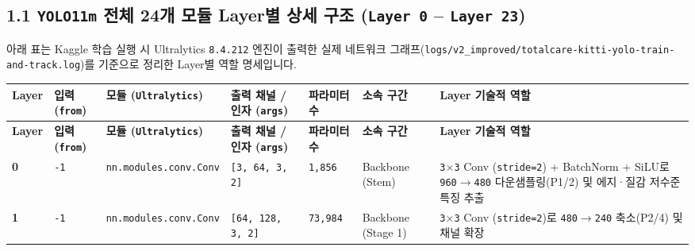 \documentclass[10.5pt,a4paper]{article}
\begin{document}
\subsection{1.1 \texttt{YOLO11m} 전체 24개 모듈 Layer별 상세 구조 (\texttt{Layer 0} -- \texttt{Layer 23})}

아래 표는 Kaggle 학습 실행 시 Ultralytics \texttt{8.\allowbreak{}4.\allowbreak{}212} 엔진이 출력한 실제 네트워크 그래프(\texttt{logs/\allowbreak{}v2\_\allowbreak{}improved/\allowbreak{}totalcare-\allowbreak{}kitti-\allowbreak{}yolo-\allowbreak{}train-\allowbreak{}and-\allowbreak{}track.\allowbreak{}log})를 기준으로 정리한 Layer별 역할 명세입니다.



\begin{footnotesize}
\setlength{\tabcolsep}{4pt}
\setlength{\LTleft}{0pt}\setlength{\LTright}{0pt}
\begin{longtable}{>{\raggedright\arraybackslash}p{} >{\raggedright\arraybackslash}p{} >{\raggedright\arraybackslash}p{} >{\raggedright\arraybackslash}p{} >{\raggedright\arraybackslash}p{} >{\raggedright\arraybackslash}p{} >{\raggedright\arraybackslash}p{}}
\toprule
\textbf{Layer} & \textbf{입력(\texttt{from})} & \textbf{모듈 (\texttt{Ultralytics})} & \textbf{출력 채널 / 인자 (\texttt{args})} & \textbf{파라미터 수} & \textbf{소속 구간} & \textbf{Layer 기술적 역할} \\
\midrule
\endfirsthead
\toprule
\textbf{Layer} & \textbf{입력(\texttt{from})} & \textbf{모듈 (\texttt{Ultralytics})} & \textbf{출력 채널 / 인자 (\texttt{args})} & \textbf{파라미터 수} & \textbf{소속 구간} & \textbf{Layer 기술적 역할} \\
\midrule
\endhead
\bottomrule
\endfoot
\textbf{0} & \texttt{-\allowbreak{}1} & \texttt{nn.\allowbreak{}modules.\allowbreak{}conv.\allowbreak{}Conv} & \texttt{[3,\allowbreak{} 64,\allowbreak{} 3,\allowbreak{} 2]} & \texttt{1,\allowbreak{}856} & Backbone (Stem) & \texttt{3$\times$3} Conv (\texttt{stride=2}) + BatchNorm + SiLU로 \texttt{960$\rightarrow$480} 다운샘플링(P1/2) 및 에지·질감 저수준 특징 추출 \\
\textbf{1} & \texttt{-\allowbreak{}1} & \texttt{nn.\allowbreak{}modules.\allowbreak{}conv.\allowbreak{}Conv} & \texttt{[64,\allowbreak{} 128,\allowbreak{} 3,\allowbreak{} 2]} & \texttt{73,\allowbreak{}984} & Backbone (Stage 1) & \texttt{3$\times$3} Conv (\texttt{stride=2})로 \texttt{480$\rightarrow$240} 축소(P2/4) 및 채널 확장 \\

\end{longtable}
\end{footnotesize}
\end{document}
